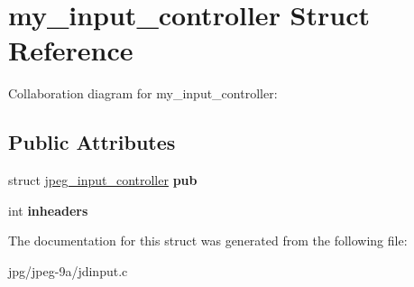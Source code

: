 \hypertarget{structmy__input__controller}{\section{my\+\_\+input\+\_\+controller Struct Reference}
\label{structmy__input__controller}
}


Collaboration diagram for my\+\_\+input\+\_\+controller\+:
\subsection*{Public Attributes}
\begin{DoxyCompactItemize}
\item 
\hypertarget{structmy__input__controller_a4ccad4a8586a7c91d0d71b45d0e78514}{struct \hyperlink{structjpeg__input__controller}{jpeg\+\_\+input\+\_\+controller} {\bfseries pub}}\label{structmy__input__controller_a4ccad4a8586a7c91d0d71b45d0e78514}

\item 
\hypertarget{structmy__input__controller_a722193efbf3a95d55c75c027be93fd31}{int {\bfseries inheaders}}\label{structmy__input__controller_a722193efbf3a95d55c75c027be93fd31}

\end{DoxyCompactItemize}


The documentation for this struct was generated from the following file\+:\begin{DoxyCompactItemize}
\item 
jpg/jpeg-\/9a/jdinput.\+c\end{DoxyCompactItemize}
